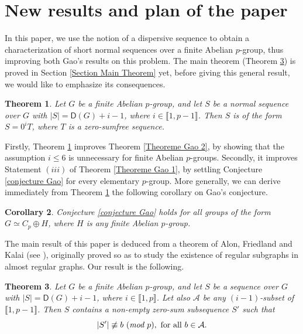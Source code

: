 \documentclass[english,12pt,a4paper,twoside]{smfart}
\theoremstyle{plain}
\newtheorem{theorem}{Theorem}[section]
\newtheorem{corollary}[theorem]{Corollary}
\theoremstyle{definition}
\theoremstyle{remark}
\begin{document}
\section{New results and plan of the paper}
\label{Section New Results}
In this paper, we use the notion of a dispersive sequence to obtain a characterization of short normal sequences over a finite Abelian $p$-group, thus improving both Gao's results on this problem. The main theorem (Theorem \ref{La Conjecture de Gao est vraie pour les p-groupes abeliens}) is proved in Section \ref{Section Main Theorem} yet, before giving this general result, we would like to emphasize its consequences.

\begin{theorem}
\label{Structure des sequences normales d'un p-groupe abelien}
Let $G$ be a finite Abelian $p$-group, and let $S$ be a normal sequence over $G$ with $\left|S\right|=\mathsf{D}(G)+i-1$, where $i \in \llbracket 1,p-1 \rrbracket$. Then $S$ is of the form $S=0^iT$, where $T$ is a zero-sumfree sequence. 
\end{theorem}

Firstly, Theorem \ref{Structure des sequences normales d'un p-groupe abelien} improves Theorem \ref{Theoreme Gao 2}, by showing that the assumption $i \leq 6$ is unnecessary for finite Abelian $p$-groups. Secondly, it improves Statement $(iii)$ of Theorem \ref{Theoreme Gao 1}, by settling Conjecture \ref{conjecture Gao} for every elementary $p$-group. More generally, we can derive immediately from Theorem \ref{Structure des sequences normales d'un p-groupe abelien} the following corollary on Gao's conjecture. 

\begin{corollary}
\label{Structure des sequences normales d'un p-groupe abelien et conjecture de Gao}
Conjecture \ref{conjecture Gao} holds for all groups of the form $G \simeq C_p \oplus H$, where $H$ is any finite Abelian $p$-group.
\end{corollary}

The main result of this paper is deduced from a theorem of Alon, Friedland and Kalai (see \cite[Theorem A.$1$]{Alon84}), originally proved so as to study the existence of regular subgraphs in almost regular graphs. Our result is the following.

\begin{theorem}
\label{La Conjecture de Gao est vraie pour les p-groupes abeliens}
Let $G$ be a finite Abelian $p$-group, and let $S$ be a sequence over $G$ with $\left|S\right|=\mathsf{D}(G)+i-1$, where $i \in \llbracket 1,p \rrbracket$. Let also $\mathcal{A}$ be any $(i-1)$-subset of $\llbracket 1,p-1 \rrbracket$. Then $S$ contains a non-empty zero-sum subsequence $S'$ such that
$$\left|S'\right| \not\equiv b \text{ } (\text{\em mod \em} p), \text{ for all } b  \in \mathcal{A}.$$
\end{theorem}
\end{document}

